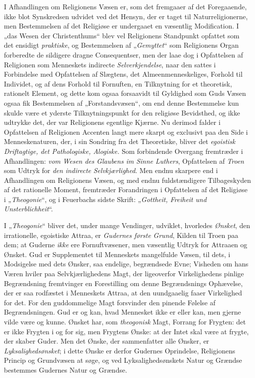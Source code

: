 I Afhandlingen om Religionens Væsen er, som det fremgaaer af det Foregaaende,
ikke blot Synskredsen udvidet ved det Hensyn, der er taget til
Naturreligionerne, men Bestemmelsen af det Religiøse er undergaaet en væsentlig
Modification. I „das Wesen der Christenthums“ blev vel Religionens Standpunkt
opfattet som det ensidigt \emph{praktiske}, og Bestemmelsen af „\emph{Gemyttet}“ som
Religionens Organ forberedte de sildigere dragne Consequentser, men der laae
 dog i Opfattelsen af Religionen som Menneskets indirecte \emph{Selverkjendelse},
naar den sattes i Forbindelse med Opfattelsen af Slægtens, det
Almeenmenneskeliges, Forhold til Individet, og af dens Forhold til Fornuften,
en Tilknytning for et theoretisk, rationelt Element, og dette kom ogsaa
forsaavidt til Gyldighed som Guds Væsen ogsaa fik Bestemmelsen af
„Forstandsvæsen“, om end denne Bestemmelse kun skulde være et yderste
Tilknytningspunkt for den religiøse Bevidsthed, og ikke udtrykke det, der var
Religionens egentlige Kjærne. Nu derimod falder i Opfattelsen af Religionen
Accenten langt mere skarpt og exclusivt paa den Side i Menneskenaturen, der, i
sin Sondring fra det Theoretiske, bliver det \emph{egoistisk Driftagtige, det
Pathologiske, Alogiske.} Som forbindende Overgang fremtræder i Afhandlingen:
\emph{vom Wesen des Glaubens im Sinne Luthers}, Opfattelsen af \emph{Troen} som
Udtryk for \emph{den indirecte Selvkjærlighed}. Men endnu skarpere end i
Afhandlingen om Religionens Væsen, og med endnu fuldstændigere Tilbageskyden af
det rationelle Moment, fremtræder Forandringen i Opfattelsen af det Religiøse i
„\emph{Theogonie}“, og i Feuerbachs sidste Skrift: „\emph{Gottheit, Freiheit und
Unsterblichheit}“.

I „\emph{Theogonie}“ bliver det, under mange Vendinger, udviklet, hvorledes
\emph{Ønsket}, den irrationelle, egoistiske Attraa, er \emph{Gudernes første Grund},
Kilden til Troen paa dem; at Guderne \emph{ikke} ere Fornuftvæsener, men
væsentlig Udtryk for Attraaen og Ønsket. Gud er Supplementet til Menneskets
mangelfulde Væsen, til dets, i Modsigelse med dets Ønsker, saa endelige,
begrændsede Evne; Visheden om hans Væren hviler paa Selvkjærlighedens Magt, der
ligeoverfor Virkelighedens pinlige Begrændsning fremtvinger en Forestilling om
denne Begrændsnings Ophævelse, der er saa rodfæstet i Menneskets Attraa, at den
uundgaaelig faaer Virkelighed for det. For den guddommelige Magt forsvinder den
pinende Følelse af Begrændsningen. Gud er og kan, hvad Mennesket ikke er eller
kan, men gjerne vilde være og kunne. Ønsket har, som \emph{theogonisk} Magt,
Forrang for Frygten:
 det er ikke Frygten i og for sig, men Frygtens Ønske: at der Intet skal være at
frygte, der skaber Guder. Men det Ønske, der sammenfatter alle Ønsker, er
\emph{Lyksalighedsønsket}; i dette Ønske er derfor Gudernes Oprindelse,
Religionens Princip og Grundvæsen at søge, og ved Lyksalighedsønskets Natur og
Grændse bestemmes Gudernes Natur og Grændse.

